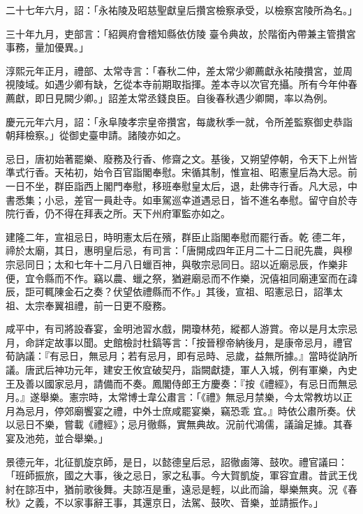 \begin{pinyinscope}
 二十七年六月，詔：「永祐陵及昭慈聖獻皇后攢宮檢察承受，以檢察宮陵所為名。」



 三十年九月，吏部言：「紹興府會稽知縣依仿陵
 臺令典故，於階銜內帶兼主管攢宮事務，量加優異。」



 淳熙元年正月，禮部、太常寺言：「春秋二仲，差太常少卿薦獻永祐陵攢宮，並周視陵域。如遇少卿有缺，乞從本寺前期取指揮。差本寺以次官充攝。所有今年仲春薦獻，即日見闕少卿。」詔差太常丞錢良臣。自後春秋遇少卿闕，率以為例。



 慶元元年六月，詔：「永阜陵孝宗皇帝攢宮，每歲秋季一就，令所差監察御史恭詣朝拜檢察。」從御史臺申請。諸陵亦如之。



 忌日，唐初始著罷樂、廢務及行香、修齋之文。基後，又朔望停朝，令天下上州皆準式行香。天祐初，始令百官詣閣奉慰。宋循其制，惟宣祖、昭憲皇后為大忌。前一日不坐，群臣詣西上閣門奉慰，移班奉慰皇太后，退，赴佛寺行香。凡大忌，中書悉集；小忌，差官一員赴寺。如車駕巡幸道遇忌日，皆不進名奉慰。留守自於寺院行香，仍不得在拜表之所。天下州府軍監亦如之。



 建隆二年，宣祖忌日，時明憲太后在殯，群臣止詣閣奉慰而罷行香。乾
 德二年，禘於太廟，其日，惠明皇后忌，有司言：「唐開成四年正月二十二日祀先農，與穆宗忌同日；太和七年十二月八日蠟百神，與敬宗忌同日。詔以近廟忌辰，作樂非便，宜令縣而不作。竊以農、蠟之祭，猶避廟忌而不作樂，況僖祖同廟連室而在諱辰，詎可輒陳金石之奏？伏望依禮縣而不作。」其後，宣祖、昭憲忌日，詔準太祖、太宗奉翼祖禮，前一日更不廢務。



 咸平中，有司將設春宴，金明池習水戲，開瓊林苑，縱都人游賞。帝以是月太宗忌
 月，命詳定故事以聞。史館檢討杜鎬等言：「按晉穆帝納後月，是康帝忌月，禮官荀訥議：『有忌日，無忌月；若有忌月，即有忌時、忌歲，益無所據。』當時從訥所議。唐武后神功元年，建安王攸宜破契丹，詣闕獻捷，軍人入城，例有軍樂，內史王及善以國家忌月，請備而不奏。鳳閣侍郎王方慶奏：『按《禮經》，有忌日而無忌月。』遂舉樂。憲宗時，太常博士韋公肅言：「《禮》無忌月禁樂，今太常教坊以正月為忌月，停郊廟饗宴之禮，中外士庶咸罷宴樂，竊恐乖
 宜。』時依公肅所奏。伏以忌日不樂，嘗載《禮經》；忌月徹縣，實無典故。況前代鴻儒，議論足據。其春宴及池苑，並合舉樂。」



 景德元年，北征凱旋京師，是日，以懿德皇后忌，詔徹鹵簿、鼓吹。禮官議曰：「班師振旅，國之大事，後之忌日，家之私事。今大賀凱旋，軍容宜肅。昔武王伐紂在諒冱中，猶前歌後舞。夫諒冱是重，遠忌是輕，以此而論，舉樂無爽。況《春秋》之義，不以家事辭王事，其還京日，法駕、鼓吹、音樂，並請振作。」




\end{pinyinscope}
